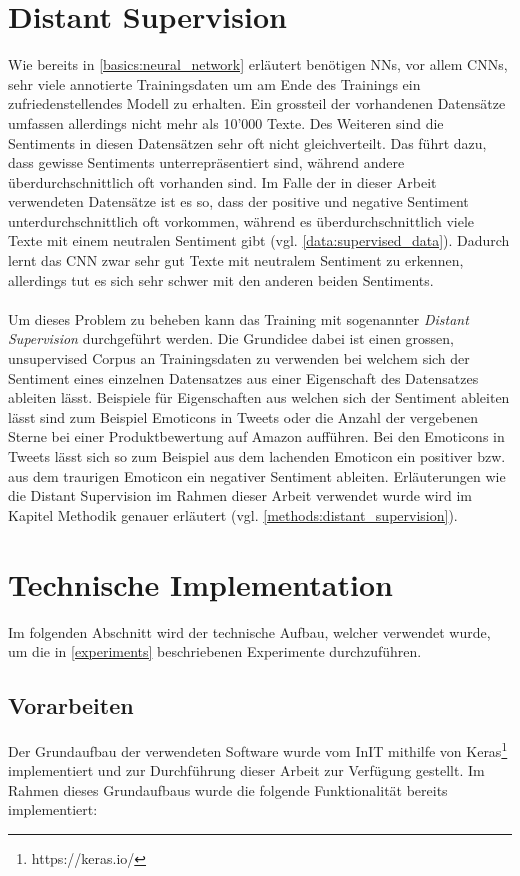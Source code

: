 \section{Distant Supervision}
Wie bereits in \ref{basics:neural_network} erläutert benötigen NNs, vor allem CNNs, sehr viele annotierte Trainingsdaten  um am Ende des Trainings ein zufriedenstellendes Modell zu erhalten. Ein grossteil der vorhandenen Datensätze umfassen allerdings nicht mehr als 10'000 Texte. Des Weiteren sind die Sentiments in diesen Datensätzen sehr oft nicht gleichverteilt. Das führt dazu, dass gewisse Sentiments unterrepräsentiert sind, während andere überdurchschnittlich oft vorhanden sind. Im Falle der in dieser Arbeit verwendeten Datensätze ist es so, dass der positive und negative Sentiment unterdurchschnittlich oft vorkommen, während es überdurchschnittlich viele Texte mit einem neutralen Sentiment gibt (vgl. \ref{data:supervised_data}). Dadurch lernt das CNN zwar sehr gut Texte mit neutralem Sentiment zu erkennen, allerdings tut es sich sehr schwer mit den anderen beiden Sentiments.\\\\
Um dieses Problem zu beheben kann das Training mit sogenannter \emph{Distant Supervision} \cite{} durchgeführt werden. Die Grundidee dabei ist einen grossen, unsupervised Corpus an Trainingsdaten zu verwenden bei welchem sich der Sentiment eines einzelnen Datensatzes aus einer Eigenschaft des Datensatzes ableiten lässt. Beispiele für Eigenschaften aus welchen sich der Sentiment ableiten lässt sind zum Beispiel Emoticons in Tweets oder die Anzahl der vergebenen Sterne bei einer Produktbewertung auf Amazon aufführen. Bei den Emoticons in Tweets lässt sich so zum Beispiel aus dem lachenden Emoticon \quotes{:-)} ein positiver bzw. aus dem traurigen Emoticon \quotes{:-(} ein negativer Sentiment ableiten. Erläuterungen wie die Distant Supervision im Rahmen dieser Arbeit verwendet wurde wird im Kapitel Methodik genauer erläutert (vgl. \ref{methods:distant_supervision}).
\section{Technische Implementation}
Im folgenden Abschnitt wird der technische Aufbau, welcher verwendet wurde, um die in \ref{experiments} beschriebenen Experimente durchzuführen.

\subsection{Vorarbeiten}
\label{technichal_setup:prework}
Der Grundaufbau der verwendeten Software wurde vom InIT mithilfe von Keras\footnote{https://keras.io/} implementiert und zur Durchführung dieser Arbeit zur Verfügung gestellt. Im Rahmen dieses Grundaufbaus wurde die folgende Funktionalität bereits implementiert:

